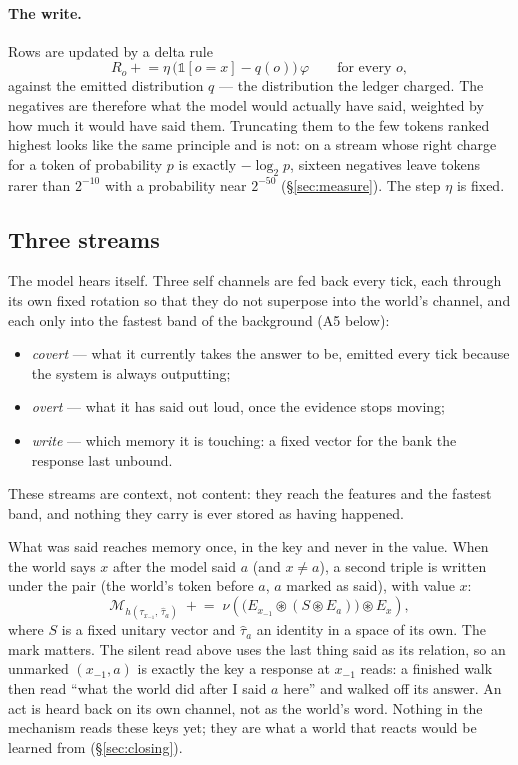 \documentclass[11pt,a4paper]{article}
\newcommand{\bind}{\mathbin{\circledast}}
\newcommand{\nrm}[1]{\nu\!\left(#1\right)}
\newcommand{\Mem}{\mathcal{M}}
\theoremstyle{plain}
\theoremstyle{definition}
\theoremstyle{remark}
\begin{document}
\paragraph{The write.} Rows are updated by a delta rule
\begin{equation}
R_o \mathrel{+}= \eta\,\big(\mathbb{1}[o=x]-q(o)\big)\,\varphi \qquad \text{for every } o,
\label{eq:delta}
\end{equation}
against the emitted distribution $q$ --- the distribution the ledger charged.
The negatives are therefore what the model would actually have said, weighted
by how much it would have said them. Truncating them to the few tokens ranked
highest looks like the same principle and is not: on a stream whose right
charge for a token of probability $p$ is exactly $-\log_2p$, sixteen negatives
leave tokens rarer than $2^{-10}$ with a probability near $2^{-50}$
(\S\ref{sec:measure}). The step $\eta$ is fixed.

\subsection{Three streams}
\label{sec:streams}

The model hears itself. Three self channels are fed back every tick, each
through its own fixed rotation so that they do not superpose into the world's
channel, and each only into the fastest band of the background (A5 below):
\begin{itemize}
\item \emph{covert} --- what it currently takes the answer to be, emitted every
tick because the system is always outputting;
\item \emph{overt} --- what it has said out loud, once the evidence stops
moving;
\item \emph{write} --- which memory it is touching: a fixed vector for the bank
the response last unbound.
\end{itemize}
These streams are context, not content: they reach the features and the
fastest band, and nothing they carry is ever stored as having happened.

What was said reaches memory once, in the key and never in the value. When the
world says $x$ after the model said $a$ (and $x\neq a$), a second triple is
written under the pair (the world's token before $a$, $a$ marked as said),
with value $x$:
\begin{equation}
\Mem_{h(\tau_{x_{-1}},\,\hat\tau_a)} \;\mathrel{+}=\;
\nrm{\big(E_{x_{-1}}\bind (S\bind E_a)\big)\bind E_{x}},
\label{eq:said}
\end{equation}
where $S$ is a fixed unitary vector and $\hat\tau_a$ an identity in a space of
its own. The mark matters. The silent read above uses the last thing said as
its relation, so an unmarked $(x_{-1},a)$ is exactly the key a response at
$x_{-1}$ reads: a finished walk then read ``what the world did after I said
$a$ here'' and walked off its answer. An act is heard back on its own channel,
not as the world's word. Nothing in the mechanism reads these keys yet; they
are what a world that reacts would be learned from (\S\ref{sec:closing}).
\end{document}
